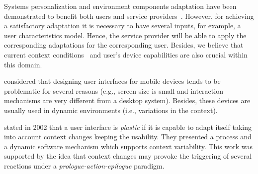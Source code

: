 Systems personalization and environment components adaptation have been demonstrated
to benefit both users and service providers~\citep{kobsa_generic_2001}. However, for
achieving a satisfactory adaptation it is necessary to have several inputs, for example,
a user characteristics model. Hence, the service provider will be able to apply the
corresponding adaptations for the corresponding user. Besides, we believe that current
context conditions~\citep{jameson_modelling_2001} and user's device capabilities are also
crucial within this domain. 

\citet{nilsson_model_based_2006} considered that designing user interfaces for
mobile devices tends to be problematic for several reasons (e.g., screen size is
small and interaction mechanisms are very different from a desktop system). Besides,
these devices are usually used in dynamic environments (i.e., variations in the
context). 


\citet{calvary_plasticity_2002} stated in 2002 that a user interface is \textit{plastic}
if it is capable to adapt itself taking into account context changes keeping
the usability. They presented a process and a dynamic software mechanism which
supports context variability. This work was supported by the idea that context
changes may provoke the triggering of several reactions under a \textit{prologue-action-epilogue}
paradigm. 

